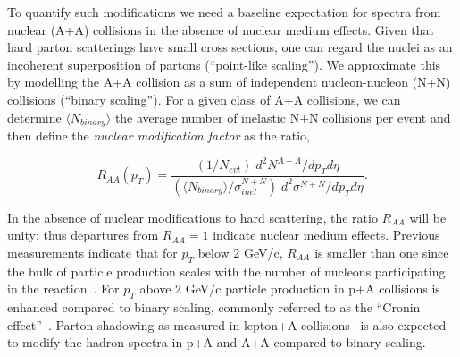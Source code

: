 \begin{multicols}{2}
To quantify such modifications we need a baseline expectation for spectra 
from nuclear (A+A) collisions in the absence of nuclear medium effects. 
Given that hard parton scatterings 
%
%
have small cross sections, 
one can regard the nuclei as an incoherent superposition of partons 
(``point-like scaling''). We approximate this by modelling the A+A 
collision as a sum of independent nucleon-nucleon (N+N) collisions 
(``binary scaling'').  
For a given class of A+A collisions, we can determine 
$\langle N_{binary} \rangle$ the average number of inelastic 
N+N collisions per event and then define the 
{\em nuclear modification factor} as the ratio,

\begin{equation}
R_{AA}(p_T) 
= \frac{(1/N_{evt}) \; d^{2}N^{A+A}/dp_T d\eta }
{(\langle N_{binary} \rangle/\sigma^{N+N}_{inel}) \; d^{2}\sigma^{N+N}/dp_T d\eta}.
\label{eq:RAA_defined}
\end{equation}


%

\noindent
In the absence of nuclear modifications to hard scattering, 
the ratio $R_{AA}$ will be unity; thus departures from $R_{AA}=1$ 
indicate nuclear medium effects. 
%
%
Previous measurements indicate that for $p_{T}$ below 2 GeV/c, $R_{AA}$ is  
smaller than one since the bulk of particle production scales with the 
number of nucleons participating in the reaction~\cite{mult,STAR}.  
%
%
For $p_{T}$ above 2 GeV/c particle production 
in p+A collisions is enhanced compared to binary scaling, 
commonly referred to as the ``Cronin effect''~\cite{cronin}.  
Parton shadowing as measured in lepton+A collisions~\cite{EMC} is
also expected to modify the hadron spectra in p+A and
A+A compared to binary scaling.



\end{multicols}

